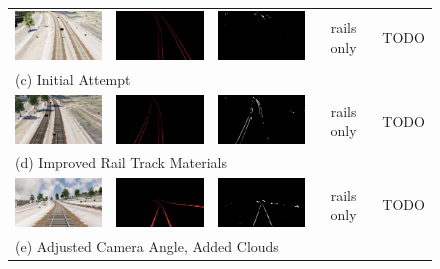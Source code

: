 \begin{figure}
\begin{tabular}{ccccc}
  \includegraphics[width=30mm]{src/img/results-ml-0/par0/frame.jpg} & 
  \includegraphics[width=30mm]{src/img/results-ml-0/par0/seg.jpg} & 
  \includegraphics[width=30mm]{src/img/results-ml-0/par0/det.jpg} &
  rails only & TODO \\
  \multicolumn{5}{l}{ (c) Initial Attempt } \\ \hline
  
  \includegraphics[width=30mm]{src/img/results-ml-0/par1/frame.jpg} & 
  \includegraphics[width=30mm]{src/img/results-ml-0/par1/seg.jpg} & 
  \includegraphics[width=30mm]{src/img/results-ml-0/par1/det.jpg} &
  rails only & TODO \\
  \multicolumn{5}{l}{   (d) Improved Rail Track Materials } \\ \hline
  
  \includegraphics[width=30mm]{src/img/results-ml-0/par2/frame.jpg} & 
  \includegraphics[width=30mm]{src/img/results-ml-0/par2/seg.jpg} & 
  \includegraphics[width=30mm]{src/img/results-ml-0/par2/det.jpg} &
  rails only & TODO \\
  \multicolumn{5}{l}{  (e) Adjusted Camera Angle, Added Clouds  } \\ \hline
  

\end{tabular}
\end{figure}
